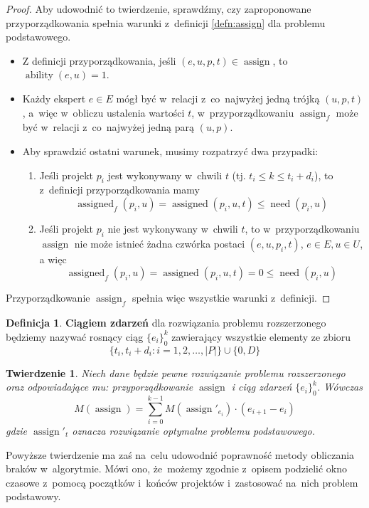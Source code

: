 \documentclass[12pt,a4paper]{article}
\newtheorem{thm}{Twierdzenie}
\theoremstyle{definition}
\newtheorem{defn}{Definicja}
\DeclareMathOperator{\ability}{ability}
\DeclareMathOperator{\need}{need}
\DeclareMathOperator{\assign}{assign}
\DeclareMathOperator{\assigned}{assigned}
\begin{document}
\begin{proof}
Aby udowodnić to twierdzenie, sprawdźmy, czy zaproponowane przyporządkowania spełnia warunki z~definicji \ref{defn:assign} dla problemu podstawowego.
\begin{itemize}
	\item Z definicji przyporządkowania, jeśli $(e, u, p, t) \in \assign$, to $\ability(e, u) = 1$.
	\item Każdy ekspert $e \in E$ mógł być w~relacji z~co~najwyżej jedną trójką $(u, p, t)$, a~więc w~obliczu ustalenia wartości $t$, w~przyporządkowaniu $\assign_f$ może być w~relacji z~co~najwyżej jedną parą $(u, p)$.
	\item Aby sprawdzić ostatni warunek, musimy rozpatrzyć dwa przypadki:
	\begin{enumerate}
		\item Jeśli projekt $p_i$ jest wykonywany w~chwili $t$ (tj. $t_i \leq k \leq t_i + d_i$), to z~definicji przyporządkowania mamy
		$$ \assigned_f(p_i, u) = \assigned(p_i, u, t) \leq \need(p_i, u) $$
		\item Jeśli projekt $p_i$ nie jest wykonywany w~chwili $t$, to w~przyporządkowaniu $\assign$ nie może istnieć żadna czwórka postaci $(e, u, p_i, t)$, $e \in E, u \in U$, a więc
		$$ \assigned_f(p_i, u) = \assigned(p_i, u, t) = 0 \leq \need(p_i, u) $$
	\end{enumerate}
\end{itemize}
Przyporządkowanie $\assign_f$ spełnia więc wszystkie warunki z~definicji.
\end{proof}

\begin{defn}
\textbf{Ciągiem zdarzeń} dla rozwiązania problemu rozszerzonego będziemy nazywać rosnący ciąg $\{e_i\}_0^k$ zawierający wszystkie elementy ze zbioru
$$ \{ t_i, t_i + d_i : i = 1, 2, \dots, |P| \} \cup \{ 0, D \} $$
\end{defn}

\begin{thm}
Niech dane będzie pewne rozwiązanie problemu rozszerzonego oraz odpowiadające mu: przyporządkowanie $\assign$ i ciąg zdarzeń $\{e_i\}_0^k$.
Wówczas
$$ M(\assign) = \sum_{i=0}^{k-1} M(\assign'_{e_i}) \cdot (e_{i+1} - e_i) $$
gdzie $\assign'_t$ oznacza rozwiązanie optymalne problemu podstawowego.
\end{thm}

\noindent
Powyższe twierdzenie ma zaś na~celu udowodnić poprawność metody obliczania braków w~algorytmie.
Mówi ono, że~możemy zgodnie z~opisem podzielić okno czasowe z~pomocą początków i~końców projektów i~zastosować na~nich problem podstawowy.
\end{document}
